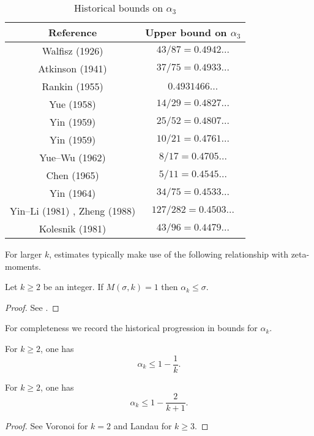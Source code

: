 \begin{table}[ht]
    \def\arraystretch{1.2}
    \centering
    \caption{Historical bounds on $\alpha_3$}
    \begin{tabular}{|c|c|}
    \hline
    Reference & Upper bound on $\alpha_3$\\
    \hline
    Walfisz (1926) \cite{walfisz_uber_1926} & $43/87 = 0.4942\ldots$\\
    \hline
    Atkinson (1941) \cite{atkinson_divisor_1941} & $37/75 = 0.4933\ldots$\\
    \hline
    Rankin (1955) \cite{rankin_van_1955} & $0.4931466\ldots$\\
    \hline
    Yue (1958) \cite{yuh_divisor_1958} & $14/29 = 0.4827\ldots$\\
    \hline 
    Yin (1959) \cite{Yin_divisor_25_52} & $25/52 = 0.4807\ldots$\\
    \hline 
    Yin (1959) \cite{Yin_divisor_10_21} & $10/21 = 0.4761\ldots$\\
    \hline
    Yue--Wu (1962) \cite{yuh_wu_divisor_1962} & $8/17 = 0.4705\ldots$\\
    \hline 
    Chen (1965) \cite{chen_divisor_1965} & $5/11 = 0.4545\ldots$\\
    \hline
    Yin (1964) \cite{Yin_divisor_34_75} & $34/75 = 0.4533\ldots$\\
    \hline
    Yin--Li (1981) \cite{Yin-Li_divisor_127_282}, Zheng (1988) \cite{Zheng_divisor_127_282} & $127/282 = 0.4503\ldots$\\
    \hline
    Kolesnik (1981) \cite{kolesnik} & $43/96 = 0.4479\ldots$\\
    \hline
    \end{tabular}
\label{div-alpha3-table}
\end{table}


For larger $k$, estimates typically make use of the following relationship with zeta-moments. 

\begin{lemma}\label{mas}  Let $k \geq 2$ be an integer. If $M(\sigma,k) = 1$ then $\alpha_k \leq \sigma$.
\end{lemma}

\begin{proof}  See \cite[\S 13.3]{ivic}.
\end{proof}

For completeness we record the historical progression in bounds for $\alpha_k$.  
\begin{lemma}\label{piltz-alpha}
For $k \ge 2$, one has
\[
\alpha_k \le 1 - \frac{1}{k}.
\]
\end{lemma}
\begin{lemma}\label{voronoi-alpha}
For $k \ge 2$, one has
\[
\alpha_k \leq 1 - \frac{2}{k + 1}.
\]
\end{lemma}
\begin{proof}
See Voronoi \cite{voronoi_sur_1903} for $k = 2$ and Landau \cite{landau_uber_1912} for $k \ge 3$. 
\end{proof}

